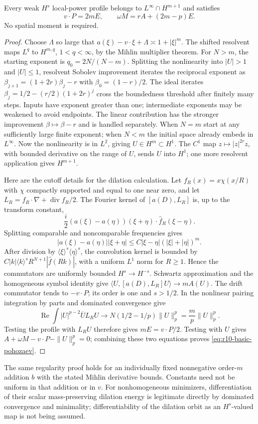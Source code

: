 \begin{lemma}
Every weak $H^s$ local-power profile belongs to $L^\infty\cap H^{m+1}$
and satisfies
\begin{equation}\label{eq:r10-basic-pohozaev}
 v\cdot P=2mE,\qquad \omega M=rA+(2m-p)E.
\end{equation}
No spatial moment is required.
\end{lemma}
\begin{proof}
Choose $\Lambda$ so large that
$a(\xi)-v\cdot\xi+\Lambda\asymp1+|\xi|^m$.
The shifted resolvent maps $L^q$ to $H^{m,q}$, $1<q<\infty$,
by the Mihlin multiplier theorem. For $N>m$, the starting exponent
is $q_0=2N/(N-m)$. Splitting the nonlinearity into $|U|>1$ and
$|U|\le1$, resolvent Sobolev improvement iterates the reciprocal
exponent as $\beta_{j+1}=(1+2r)\beta_j-r$ with
$\beta_0=(1-r)/2$. The ideal iterates
$\beta_j=1/2-(r/2)(1+2r)^j$ cross the boundedness threshold after
finitely many steps. Inputs have exponent greater than one; intermediate
exponents may be weakened to avoid endpoints. The linear contribution
has the stronger improvement $\beta\mapsto\beta-r$ and is handled
separately. When $N=m$ start at any sufficiently large finite exponent;
when $N<m$ the initial space already embeds in $L^\infty$.
Now the nonlinearity is in $L^2$, giving $U\in H^m\subset H^1$.
The $C^1$ map $z\mapsto|z|^{2r}z$, with bounded derivative on the
range of $U$, sends $U$ into $H^1$; one more resolvent application
gives $H^{m+1}$.

Here are the cutoff details for the dilation calculation. Let
$f_R(x)=x\chi(x/R)$ with $\chi$ compactly supported and equal to
one near zero, and let $L_R=f_R\cdot\nabla+\operatorname{div}f_R/2$.
The Fourier kernel of $[a(D),L_R]$ is, up to the transform constant,
\[
 \frac i2(a(\xi)-a(\eta))(\xi+\eta)\cdot\widehat f_R(\xi-\eta).
\]
Splitting comparable and noncomparable frequencies gives
\[
 |a(\xi)-a(\eta)||\xi+\eta|
 \le C|\xi-\eta|(|\xi|+|\eta|)^m.
\]
After division by $\langle\xi\rangle^s\langle\eta\rangle^s$,
the convolution kernel is bounded by
$C|k|\langle k\rangle^s R^{N+1}|\widehat f(Rk)|$, with a
uniform $L^1$ norm for $R\ge1$. Hence the commutators are uniformly
bounded $H^s\to H^{-s}$. Schwartz approximation and the homogeneous
symbol identity give
$\langle U,[a(D),L_R]U\rangle\to mA(U)$.
The drift commutator tends to $-v\cdot P$; its order is one and
$s>1/2$. In the nonlinear pairing integration by parts and dominated
convergence give
\[
 \operatorname{Re}\int |U|^{p-2}\overline U L_RU
 \longrightarrow N(1/2-1/p)\|U\|_p^p=\frac m p\|U\|_p^p.
\]
Testing the profile with $L_RU$ therefore gives $mE=v\cdot P/2$.
Testing with $U$ gives $A+\omega M-v\cdot P-\|U\|_p^p=0$;
combining these two equations proves \eqref{eq:r10-basic-pohozaev}.
\end{proof}

The same regularity proof holds for an individually fixed nonnegative
order-$m$ addition $b$ with the stated Mihlin derivative bounds.
Constants need not be uniform in that addition or in $v$.
For nonhomogeneous minimizers, differentiation of their scalar
mass-preserving dilation energy is legitimate directly by dominated
convergence and minimality; differentiability of the dilation orbit
as an $H^s$-valued map is not being assumed.
